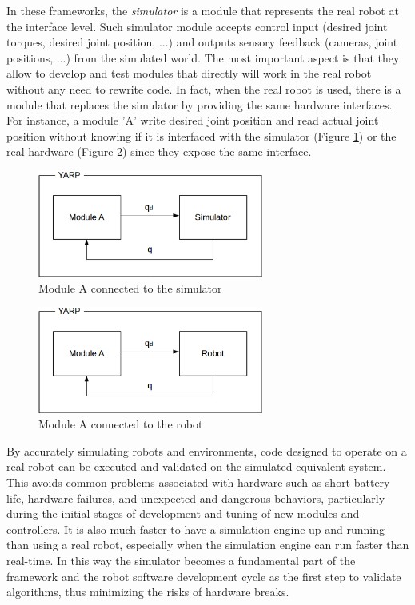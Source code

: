 In these frameworks, the \emph{simulator} is a module that represents the real robot at the interface level. Such simulator module accepts control input (desired joint torques, desired joint position, ...) and outputs sensory feedback (cameras, joint positions, ...) from the simulated world. The most important aspect is that they allow to develop and test modules that directly will work in the real robot without any need to rewrite code. In fact, when the real robot is used, there is a module that replaces the simulator by providing the same hardware interfaces. For instance, a module 'A' write desired joint position and read actual joint position without knowing if it is interfaced with the simulator (Figure \ref{yarp_simulation_a}) or the real hardware (Figure \ref{yarp_simulation_b}) since they expose the same interface.
\begin{figure}
\centering
\includegraphics[height=3.5cm]{gfx/yarp_simulation_a.eps}
\caption{Module A connected to the simulator}
\label{yarp_simulation_a}
\end{figure}

\begin{figure}
\centering
\includegraphics[height=3.5cm]{gfx/yarp_simulation_b.eps}
\caption{Module A connected to the robot}
\label{yarp_simulation_b}
\end{figure}

By accurately simulating robots and environments, code designed to operate on a real robot can be executed and validated on the simulated equivalent system. This avoids common problems associated with hardware such as short battery life, hardware failures, and unexpected and dangerous behaviors, particularly during the initial stages of development and tuning of new modules and controllers. 
It is also much faster to have a simulation engine up and running than using a real robot, especially when the simulation engine can run faster than real-time. In this way the simulator becomes a fundamental part of the framework and the robot software development cycle as the first step to validate algorithms, thus minimizing the risks of hardware breaks. 

